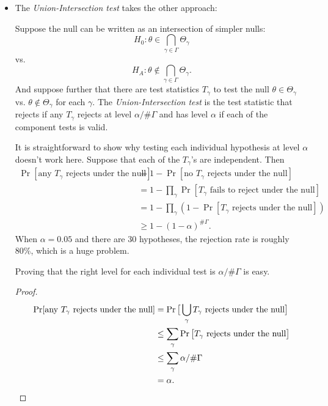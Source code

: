 \begin{itemize}[leftmargin=0pt]
\item The \emph{Union-Intersection test} takes the other approach:
  \begin{defn}
    Suppose the null can be written as an intersection of simpler
    nulls:
    \begin{equation*}
      H_0: \theta \in \bigcap_{\gamma \in \Gamma} \Theta_\gamma
    \end{equation*}
    vs.
    \begin{equation*}
      H_A: \theta \notin \bigcap_{\gamma \in \Gamma} \Theta_\gamma.
    \end{equation*}
    And suppose further that there are test statistics $T_\gamma$ to
    test the null $\theta \in \Theta_\gamma$ vs. $\theta \notin
    \Theta_\gamma$ for each $\gamma$.
    The \emph{Union-Intersection test} is the test statistic that
    rejects if any $T_\gamma$ rejects at level $\alpha / \#\Gamma$ and
    has level $\alpha$ if each of the component tests is valid.
  \end{defn}

  It is straightforward to show why testing each individual hypothesis
  at level $\alpha$ doesn't work here. Suppose that each of the
  $T_\gamma$'s are independent. Then
  \begin{align*}
    \Pr[\text{any } T_\gamma \text{ rejects under the null}]
    &= 1 - \Pr[\text{no } T_\gamma \text{ rejects under the null}] \\
    &= 1 - \prod_\gamma \Pr[T_\gamma \text{ fails to reject under the
      null}] \\
    &= 1 - \prod_\gamma (1 - \Pr[T_\gamma \text{ rejects under the
      null}]) \\
    &\geq 1 - (1 - \alpha)^{\#\Gamma}.
  \end{align*}
  When $\alpha = 0.05$ and there are 30 hypotheses, the rejection rate
  is roughly 80\%, which is a huge problem.

  Proving that the right level for each individual test is
  $\alpha/\#\Gamma$ is easy.
  \begin{proof}
    \begin{align*}
      \Pr[\text{any } T_\gamma \text{ rejects under the null}]
      &= \Pr\big[ \bigcup_\gamma T_\gamma \text{ rejects under the null}\big] \\
      &\leq \sum_\gamma \Pr\big[ T_\gamma \text{ rejects under the null}\big] \\ 
      &\leq \sum_\gamma \alpha / \# \Gamma \\
      &= \alpha. \qedhere
    \end{align*}
  \end{proof}
\end{itemize}

